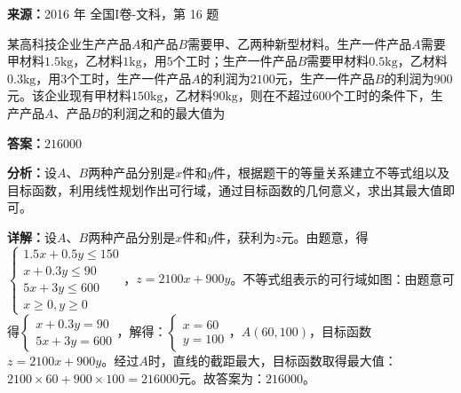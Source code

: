 \begin{question}[points=5]
\textbf{来源：}2016 年 全国I卷-文科，第 16 题\par
某高科技企业生产产品$A$和产品$B$需要甲、乙两种新型材料。生产一件产品$A$需要甲材料$1.5\text{kg}$，乙材料$1\text{kg}$，用$5$个工时；生产一件产品$B$需要甲材料$0.5\text{kg}$，乙材料$0.3\text{kg}$，用$3$个工时，生产一件产品$A$的利润为$2100$元，生产一件产品$B$的利润为$900$元。该企业现有甲材料$150\text{kg}$，乙材料$90\text{kg}$，则在不超过$600$个工时的条件下，生产产品$A$、产品$B$的利润之和的最大值为
\fillin[{$216000$}]
\begin{solution}
\textbf{答案：}$216000$

\textbf{分析：}设$A$、$B$两种产品分别是$x$件和$y$件，根据题干的等量关系建立不等式组以及目标函数，利用线性规划作出可行域，通过目标函数的几何意义，求出其最大值即可。

\textbf{详解：}设$A$、$B$两种产品分别是$x$件和$y$件，获利为$z$元。由题意，得$\begin{cases} 1.5x+0.5y\le150 \\ x+0.3y\le90 \\ 5x+3y\le600 \\ x\ge0,y\ge0 \end{cases}$，$z=2100x+900y$。不等式组表示的可行域如图：由题意可得$\begin{cases} x+0.3y=90 \\ 5x+3y=600 \end{cases}$，解得：$\begin{cases} x=60 \\ y=100 \end{cases}$，$A(60,100)$，目标函数$z=2100x+900y$。经过$A$时，直线的截距最大，目标函数取得最大值：$2100\times60+900\times100=216000$元。故答案为：$216000$。
\end{solution}
\end{question}

